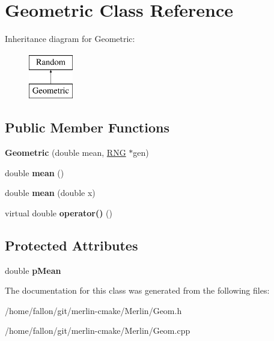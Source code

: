 \hypertarget{classGeometric}{}\section{Geometric Class Reference}
\label{classGeometric}
Inheritance diagram for Geometric\+:\begin{figure}[H]
\begin{center}
\leavevmode
\includegraphics[height=2.000000cm]{classGeometric}
\end{center}
\end{figure}
\subsection*{Public Member Functions}
\begin{DoxyCompactItemize}
\item 
\mbox{\label{classGeometric_ad840da2e2d8374dad4c3f96e6016a8e2}} 
{\bfseries Geometric} (double mean, \hyperlink{classRNG}{R\+NG} $\ast$gen)
\item 
\mbox{\label{classGeometric_ab6e40ae0b3e3a4c19015cadf3e55895e}} 
double {\bfseries mean} ()
\item 
\mbox{\label{classGeometric_a42ce5ab70e53854595fa9b5924491957}} 
double {\bfseries mean} (double x)
\item 
\mbox{\label{classGeometric_aa3aedf1004991f7cc5af61cc2ccb832d}} 
virtual double {\bfseries operator()} ()
\end{DoxyCompactItemize}
\subsection*{Protected Attributes}
\begin{DoxyCompactItemize}
\item 
\mbox{\label{classGeometric_a19f80fe921231d13b53f37e0c45381e0}} 
double {\bfseries p\+Mean}
\end{DoxyCompactItemize}


The documentation for this class was generated from the following files\+:\begin{DoxyCompactItemize}
\item 
/home/fallon/git/merlin-\/cmake/\+Merlin/Geom.\+h\item 
/home/fallon/git/merlin-\/cmake/\+Merlin/Geom.\+cpp\end{DoxyCompactItemize}
